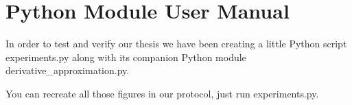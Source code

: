 \section{Python Module User Manual}

In order to test and verify our thesis we have been creating
a little Python script experiments.py along with its
companion Python module derivative\_approximation.py.

You can recreate all those figures in our protocol, just run experiments.py.
